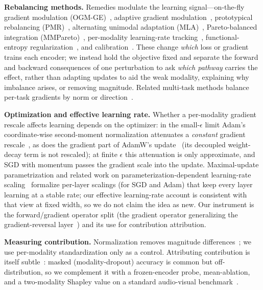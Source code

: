 \documentclass[conference]{IEEEtran}
\begin{document}
\textbf{Rebalancing methods.} Remedies modulate the learning signal---on-the-fly gradient modulation (OGM-GE)~\cite{peng2022balanced}, adaptive gradient modulation~\cite{li2023boosting}, prototypical rebalancing (PMR)~\cite{fan2023pmr}, alternating unimodal adaptation (MLA)~\cite{zhang2024mla}, Pareto-balanced integration (MMPareto)~\cite{wei2024mmpareto}, per-modality learning-rate tracking~\cite{sun2021learning}, functional-entropy regularization~\cite{gat2020removing}, and calibration~\cite{ma2023calibrating}. These change \emph{which} loss or gradient trains each encoder; we instead hold the objective fixed and separate the forward and backward consequences of one perturbation to ask \emph{which pathway} carries the effect, rather than adapting updates to aid the weak modality, explaining why imbalance arises, or removing magnitude. Related multi-task methods balance per-task gradients by norm or direction~\cite{chen2018gradnorm,yu2020gradient}.

\textbf{Optimization and effective learning rate.} Whether a per-modality gradient rescale affects learning depends on the optimizer: in the small-$\epsilon$ limit Adam's~\cite{kingma2015adam} coordinate-wise second-moment normalization attenuates a \emph{constant} gradient rescale~\cite{balles2018dissecting,bernstein2018signsgd,kunstner2023noise}, as does the gradient part of AdamW's update~\cite{loshchilov2019decoupled} (its decoupled weight-decay term is not rescaled); at finite $\epsilon$ this attenuation is only approximate, and SGD with momentum passes the gradient scale into the update. Maximal-update parametrization and related work on parameterization-dependent learning-rate scaling~\cite{yang2022tensor,everett2024scaling} formalize per-layer scalings (for SGD and Adam) that keep every layer learning at a stable rate; our effective learning-rate account is consistent with that view at fixed width, so we do not claim the idea as new. Our instrument is the forward/gradient operator split (the gradient operator generalizing the gradient-reversal layer~\cite{ganin2015domain}) and its use for contribution attribution.

\textbf{Measuring contribution.} Normalization removes magnitude differences~\cite{santurkar2018how}; we use per-modality standardization only as a control. Attributing contribution is itself subtle~\cite{hessel2020does,wei2024valuation}: masked (modality-dropout) accuracy is common but off-distribution, so we complement it with a frozen-encoder probe, mean-ablation, and a two-modality Shapley value on a standard audio-visual benchmark~\cite{cao2014crema}.
\end{document}
